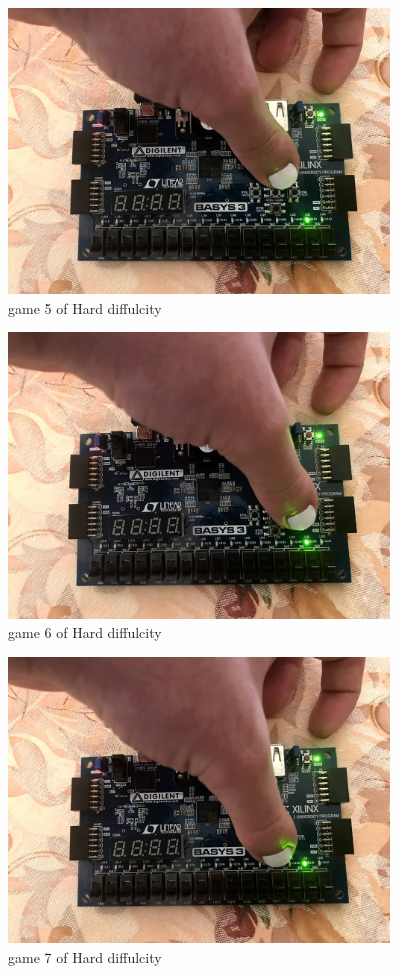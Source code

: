 \documentclass[11pt]{article}
\begin{document}
\begin{figure}
	\includegraphics[width=0.9\textwidth]{IMG_1305.jpg}
	\caption{game 5 of Hard diffulcity }
	\label{fig:sim_with_table}
\end{figure}
\begin{figure}
	\includegraphics[width=0.9\textwidth]{IMG_1306.jpg}
	\caption{game 6 of Hard diffulcity }
	\label{fig:sim_with_table}
\end{figure}
\begin{figure}
	\includegraphics[width=0.9\textwidth]{IMG_1307.jpg}
	\caption{game 7 of Hard diffulcity }
	\label{fig:sim_with_table}
\end{figure}
\end{document}
